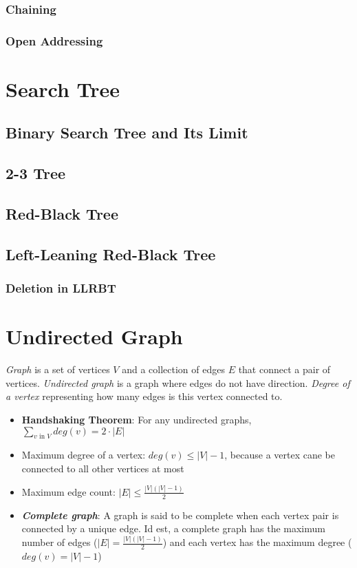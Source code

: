 \documentclass{report}
\begin{document}
\subsection{Chaining}

\subsection{Open Addressing}


\chapter{Search Tree}

\section{Binary Search Tree and Its Limit}

\section{2-3 Tree}

\section{Red-Black Tree}

\section{Left-Leaning Red-Black Tree}

\subsection{Deletion in LLRBT}


\chapter{Undirected Graph}

\textit{Graph} is a set of vertices $V$ and a collection of edges $E$ that connect a pair of vertices. \textit{Undirected graph} is a graph where edges do not have direction. \textit{Degree of a vertex} representing how many edges is this vertex connected to.

\begin{itemize}
  \item \textbf{Handshaking Theorem}: For any undirected graphs, \(\sum_{v \text{ in } V} deg(v) = 2 \cdot |E|\)
  \item Maximum degree of a vertex: $deg(v) \leq |V| - 1$, because a vertex cane be connected to all other vertices at most
  \item Maximum edge count: $|E| \leq \frac{|V|(|V| - 1)}{2}$
  \item \textbf{\textit{Complete graph}}: A graph is said to be complete when each vertex pair is connected by a unique edge. Id est, a complete graph has the maximum number of edges ($|E| = \frac{|V|(|V| - 1)}{2}$) and each vertex has the maximum degree ($deg(v) = |V| - 1$)
\end{itemize}
\end{document}
